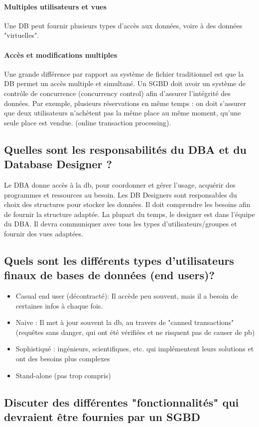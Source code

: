 \paragraph{Multiples utilisateurs et vues} Une DB peut fournir plusieurs 
types d'accès aux données, voire à des données "virtuelles". 

\paragraph{Accès et modifications multiples} Une grande différence par rapport 
au système de fichier traditionnel est que la DB permet un accès 
multiple et simultané. Un SGBD doit avoir un système de contrôle de concurrence 
(concurrency control) afin d'assurer l'intégrité des données. 
Par exemple, plusieurs réservations en même temps : on doit s'assurer que 
deux utilisateurs n'achètent pas la même place au même moment, qu'une 
seule place est vendue. (online transaction processing).


\subsection{Quelles sont les responsabilités du DBA et du Database Designer ?}
Le DBA donne accès à la db, pour coordonner et gérer l'usage, acquérir des programmes et ressources au besoin. Les DB Designers sont responsables du 
choix des structures pour stocker les données. Il doit comprendre les 
besoins afin de fournir la structure adaptée. La plupart du temps, 
le designer est dans l'équipe du DBA. 
Il devra communiquer avec tous les types d'utilisateurs/groupes et 
fournir des vues adaptées. 


\subsection{Quels sont les différents types d'utilisateurs finaux de bases de données (end users)?}
\begin{itemize}
	\item Casual end user (décontracté): Il accède peu souvent, mais il a besoin de certaines infos à chaque fois.
	\item Naive : Il met à jour souvent la db, au travers de "canned transactions" 
	(requêtes sans danger, qui ont été vérifiées et ne risquent pas de causer de pb)
	\item Sophistiqué : ingénieurs, scientifiques, etc. qui implémentent leurs solutions 
	et ont des besoins plus complexes
	\item Stand-alone (pas trop compris)
\end{itemize}


\subsection{Discuter des différentes "fonctionnalités" qui devraient être fournies par un SGBD}
